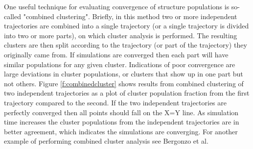 One useful technique for evaluating convergence of structure populations is so-called "combined clustering". Briefly, in this method two or more independent trajectories are combined into a single trajectory (or a single trajectory is divided into two or more parts), on which cluster analysis is performed. The resulting clusters are then split according to the trajectory (or part of the trajectory) they originally came from. If simulations are converged then each part will have similar populations for any given cluster. Indications of poor convergence are large deviations in cluster populations, or clusters that show up in one part but not others. Figure \ref{f:combinedcluster} shows results from combined clustering of two independent trajectories as a plot of cluster population fraction from the first trajectory compared to the second. If the two independent trajectories are perfectly converged then all points should fall on the X=Y line. As simulation time increases the cluster populations from the independent trajectories are in better agreement, which indicates the simulations are converging. For another example of performing combined cluster analysis see Bergonzo et al.\citep{Bergonzo2014}
